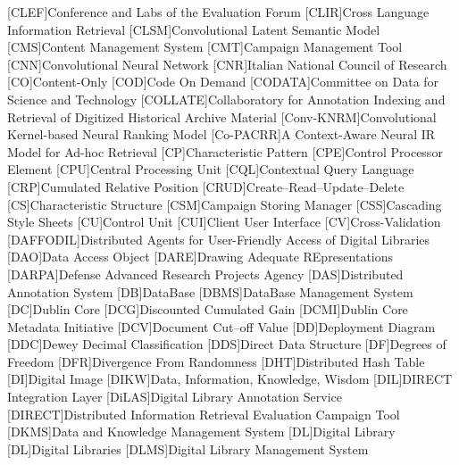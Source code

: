 [CLEF]{Conference and Labs of the Evaluation Forum}
[CLIR]{Cross Language Information Retrieval}
[CLSM]{Convolutional Latent Semantic Model}
[CMS]{Content Management System}
[CMT]{Campaign Management Tool}
[CNN]{Convolutional Neural Network}
[CNR]{Italian National Council of Research}
[CO]{Content-Only}
[COD]{Code On Demand}
[CODATA]{Committee on Data for Science and Technology}
[COLLATE]{Collaboratory for Annotation Indexing and Retrieval of Digitized Historical Archive Material}
[Conv-KNRM]{Convolutional Kernel-based Neural Ranking Model}
[Co-PACRR]{A Context-Aware Neural IR Model for Ad-hoc Retrieval}
[CP]{Characteristic Pattern}
[CPE]{Control Processor Element}
[CPU]{Central Processing Unit}
[CQL]{Contextual Query Language}
[CRP]{Cumulated Relative Position}
[CRUD]{Create--Read--Update--Delete}
[CS]{Characteristic Structure}
[CSM]{Campaign Storing Manager}
[CSS]{Cascading Style Sheets}
[CU]{Control Unit}
[CUI]{Client User Interface}
[CV]{Cross-Validation}
[DAFFODIL]{Distributed Agents for User-Friendly Access of Digital Libraries}
[DAO]{Data Access Object}
[DARE]{Drawing Adequate REpresentations}
[DARPA]{Defense Advanced Research Projects Agency}
[DAS]{Distributed Annotation System}
[DB]{DataBase}
[DBMS]{DataBase Management System}
[DC]{Dublin Core}
[DCG]{Discounted Cumulated Gain}
[DCMI]{Dublin Core Metadata Initiative}
[DCV]{Document Cut--off Value}
[DD]{Deployment Diagram}
[DDC]{Dewey Decimal Classification}
[DDS]{Direct Data Structure}
[DF]{Degrees of Freedom}
[DFR]{Divergence From Randomness}
[DHT]{Distributed Hash Table}
[DI]{Digital Image}
[DIKW]{Data, Information, Knowledge, Wisdom}
[DIL]{\acs{DIRECT} Integration Layer}
[DiLAS]{Digital Library Annotation Service}
[DIRECT]{Distributed Information Retrieval Evaluation Campaign Tool}
[DKMS]{Data and Knowledge Management System}
[DL]{Digital Library}
[DL]{Digital Libraries}
[DLMS]{Digital Library Management System}
